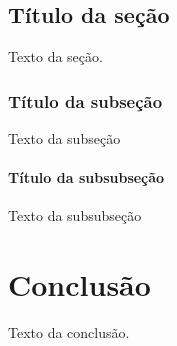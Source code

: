 \documentclass[a4paper,12pt,oneside,onecolumn,final,fleqn]{repUERJ}
\begin{document}
\section{Título da seção}

Texto da seção.

\subsection{Título da subseção}

Texto da subseção

\subsubsection{Título da subsubseção}

Texto da subsubseção

\chapter*{Conclusão}

Texto da conclusão.


\backmatter %




\appendix %
\end{document}
